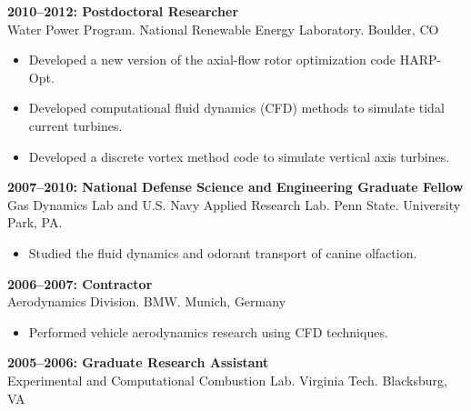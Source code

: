 \vspace{-0.1in}
\textbf{2010--2012: Postdoctoral Researcher}\\
Water Power Program. National Renewable Energy Laboratory. Boulder, CO\\
\vspace{-0.35in}
\begin{itemize}
  \item Developed a new version of the axial-flow rotor optimization code HARP-Opt.
  \vspace{-0.1in}
  \item Developed computational fluid dynamics (CFD) methods to simulate tidal current turbines.
  \vspace{-0.1in}
  \item Developed a discrete vortex method code to simulate vertical axis turbines.
\end{itemize}
\vspace{-0.1in}
\textbf{2007--2010: National Defense Science and Engineering Graduate Fellow}\\
Gas Dynamics Lab and U.S. Navy Applied Research Lab. Penn State. University Park, PA. \\
\vspace{-0.35in}
\begin{itemize}
  \item Studied the fluid dynamics and odorant transport of canine olfaction.
\end{itemize}
\vspace{-0.1in}
\textbf{2006--2007:  Contractor}\\
Aerodynamics Division. BMW. Munich, Germany\\
\vspace{-0.35in}
\begin{itemize}
  \item Performed vehicle aerodynamics research using CFD techniques.
\end{itemize}
\vspace{-0.1in}
\textbf{2005--2006: Graduate Research Assistant}\\
Experimental and Computational Combustion Lab. Virginia Tech. Blacksburg, VA\\



